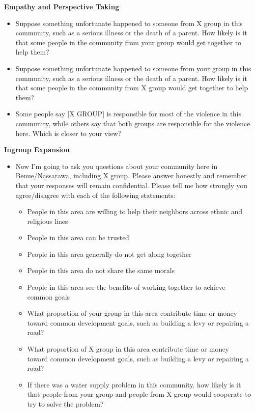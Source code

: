 \documentclass[11pt]{article}
\providecommand{\tightlist}{%
  \setlength{\itemsep}{0pt}\setlength{\parskip}{0pt}}
\begin{document}
\textbf{Empathy and Perspective Taking}

\begin{itemize}
\tightlist
\item
  Suppose something unfortunate happened to someone from X group in this
  community, such as a serious illness or the death of a parent. How
  likely is it that some people in the community from your group would
  get together to help them?
\item
  Suppose something unfortunate happened to someone from your group in
  this community, such as a serious illness or the death of a parent.
  How likely is it that some people in the community from X group would
  get together to help them?
\end{itemize}

\smallskip

\begin{itemize}
\tightlist
\item
  Some people say {[}X GROUP{]} is responsible for most of the violence
  in this community, while others say that both groups are responsible
  for the violence here. Which is closer to your view?
\end{itemize}

\textbf{Ingroup Expansion}

\begin{itemize}
\tightlist
\item
  Now I'm going to ask you questions about your community here in
  Benue/Nassarawa, including X group. Please answer honestly and
  remember that your responses will remain confidential. Please tell me
  how strongly you agree/disagree with each of the following statements:

  \begin{itemize}
  \tightlist
  \item
    People in this area are willing to help their neighbors across
    ethnic and religious lines
  \item
    People in this area can be trusted
  \item
    People in this area generally do not get along together
  \item
    People in this area do not share the same morals
  \item
    People in this area see the benefits of working together to achieve
    common goals
  \item
    What proportion of your group in this area contribute time or money
    toward common development goals, such as building a levy or
    repairing a road?
  \item
    What proportion of X group in this area contribute time or money
    toward common development goals, such as building a levy or
    repairing a road?
  \item
    If there was a water supply problem in this community, how likely is
    it that people from your group and people from X group would
    cooperate to try to solve the problem?
  \end{itemize}
\end{itemize}
\end{document}
